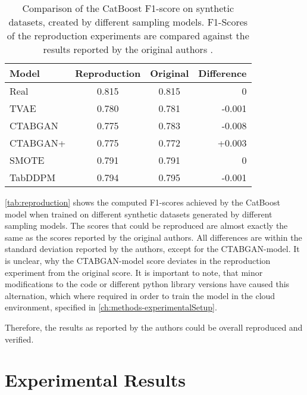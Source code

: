 \begin{table}[h]
	\centering
	\begin{tabular}{l|c|c|r}
		\hline
		\textbf{Model} & \textbf{Reproduction} & \textbf{Original} & \textbf{Difference} \\ \hline
		Real           & 0.815                 & 0.815             & 0                   \\ \hline
		TVAE           & 0.780                 & 0.781             & -0.001              \\ \hline
		CTABGAN        & 0.775                 & 0.783             & -0.008              \\ \hline
		CTABGAN+       & 0.775                 & 0.772             & +0.003              \\ \hline
		SMOTE          & 0.791                 & 0.791             & 0                   \\ \hline
		TabDDPM        & 0.794                 & 0.795             & -0.001              \\ \hline
	\end{tabular}
	\caption[Reproduction of original Results]{Comparison of the CatBoost F1-score on synthetic datasets, created by different sampling models.
		F1-Scores of the reproduction experiments are compared against the results reported by the original authors \cite[Table 4, p. 8]{kotelnikov2022TabDDPMModellingTabular}.}
	\label{tab:reproduction}
\end{table}

\autoref{tab:reproduction} shows the computed F1-scores achieved by the CatBoost model when trained on different synthetic datasets generated by different sampling models.
The scores that could be reproduced are almost exactly the same as the scores reported by the original authors.
All differences are within the standard deviation reported by the authors, except for the CTABGAN-model.
It is unclear, why the CTABGAN-model score deviates in the reproduction experiment from the original score.
It is important to note, that minor modifications to the code or different python library versions have caused this alternation, which where required in order to train the model in the cloud environment, specified in \autoref{ch:methods-experimentalSetup}.

Therefore, the results as reported by the authors could be overall reproduced and verified.

\section{Experimental Results}
\label{ch:results-experimentalResults}

